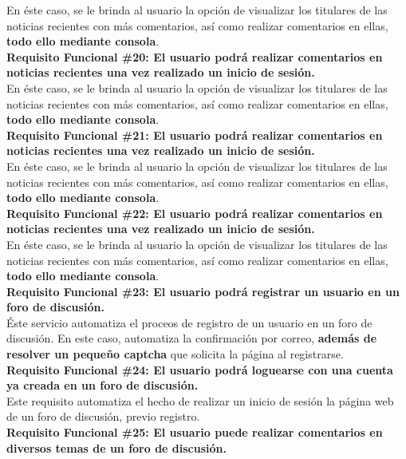 \begin{adjustwidth}{0.5cm}{}
	En éste caso, se le brinda al usuario la opción de visualizar los titulares de las noticias recientes con más comentarios, así como realizar comentarios en ellas, \textbf{todo ello mediante consola}. \\
	\linebreak	
	\textbf{Requisito Funcional \#20: El usuario podrá realizar comentarios en noticias recientes una vez realizado un inicio de sesión.}\\
	En éste caso, se le brinda al usuario la opción de visualizar los titulares de las noticias recientes con más comentarios, así como realizar comentarios en ellas, \textbf{todo ello mediante consola}. \\
	\linebreak	
	\textbf{Requisito Funcional \#21: El usuario podrá realizar comentarios en noticias recientes una vez realizado un inicio de sesión.}\\
	En éste caso, se le brinda al usuario la opción de visualizar los titulares de las noticias recientes con más comentarios, así como realizar comentarios en ellas, \textbf{todo ello mediante consola}. \\
	\linebreak	
	\textbf{Requisito Funcional \#22: El usuario podrá realizar comentarios en noticias recientes una vez realizado un inicio de sesión.}\\
	En éste caso, se le brinda al usuario la opción de visualizar los titulares de las noticias recientes con más comentarios, así como realizar comentarios en ellas, \textbf{todo ello mediante consola}. \\				
	\linebreak		
	\textbf{Requisito Funcional \#23: El usuario podrá registrar un usuario en un foro de discusión.}\\
	Éste servicio automatiza el proceos de registro de un usuario en un foro de discusión. En este caso, automatiza la confirmación por correo, \textbf{además de resolver un pequeño captcha} que solicita la página al registrarse. \\
	\linebreak	
	\textbf{Requisito Funcional \#24: El usuario podrá loguearse con una cuenta ya creada en un foro de discusión.}\\
	Este requisito automatiza el hecho de realizar un inicio de sesión la página web de un foro de discusión, previo registro. \\
	\linebreak	
	\textbf{Requisito Funcional \#25: El usuario puede realizar comentarios en diversos temas de un foro de discusión.}\\

\end{adjustwidth}
